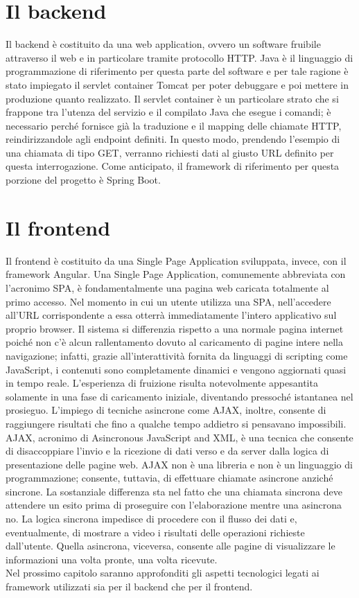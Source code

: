 \section{Il backend}

Il backend è costituito da una web application, ovvero un software fruibile attraverso il web e in particolare tramite protocollo HTTP.
Java è il linguaggio di programmazione di riferimento per questa parte del software e per tale ragione è stato impiegato il servlet container Tomcat per poter debuggare e poi
mettere in produzione quanto realizzato.
Il servlet container è un particolare strato che si frappone tra l'utenza del servizio e il compilato Java che esegue i comandi; è necessario perché fornisce già 
la traduzione e il mapping delle chiamate HTTP, reindirizzandole agli endpoint definiti.
In questo modo, prendendo l'esempio di una chiamata di tipo GET, verranno richiesti dati al giusto URL definito per questa interrogazione.
Come anticipato, il framework di riferimento per questa porzione del progetto è Spring Boot.

\section{Il frontend}

Il frontend è costituito da una Single Page Application sviluppata, invece, con il framework Angular.
Una Single Page Application, comunemente abbreviata con l'acronimo SPA, è fondamentalmente una pagina web caricata totalmente al primo accesso.
Nel momento in cui un utente utilizza una SPA, nell'accedere all'URL corrispondente a essa otterrà immediatamente l'intero applicativo sul proprio browser.
Il sistema si differenzia rispetto a una normale pagina internet poiché non c'è alcun rallentamento dovuto al caricamento di pagine intere nella navigazione; infatti, grazie 
all'interattività fornita da linguaggi di scripting come JavaScript, i contenuti sono completamente dinamici e vengono aggiornati quasi in tempo reale.
L'esperienza di fruizione risulta notevolmente appesantita solamente in una fase di caricamento iniziale, diventando pressoché istantanea nel prosieguo.
L'impiego di tecniche asincrone come AJAX, inoltre, consente di raggiungere risultati che fino a qualche tempo addietro si pensavano impossibili.
AJAX, acronimo di Asincronous JavaScript and XML, è una tecnica che consente di disaccoppiare l'invio e la ricezione di dati verso e da server dalla logica di presentazione delle 
pagine web.
AJAX non è una libreria e non è un linguaggio di programmazione; consente, tuttavia, di effettuare chiamate asincrone anziché sincrone.
La sostanziale differenza sta nel fatto che una chiamata sincrona deve attendere un esito prima di proseguire con l'elaborazione mentre una asincrona no.
La logica sincrona impedisce di procedere con il flusso dei dati e, eventualmente, di mostrare a video i risultati delle operazioni richieste dall'utente.
Quella asincrona, viceversa, consente alle pagine di visualizzare le informazioni una volta pronte, una volta ricevute.
\\
Nel prossimo capitolo saranno approfonditi gli aspetti tecnologici legati ai framework utilizzati sia per il backend che per il frontend.